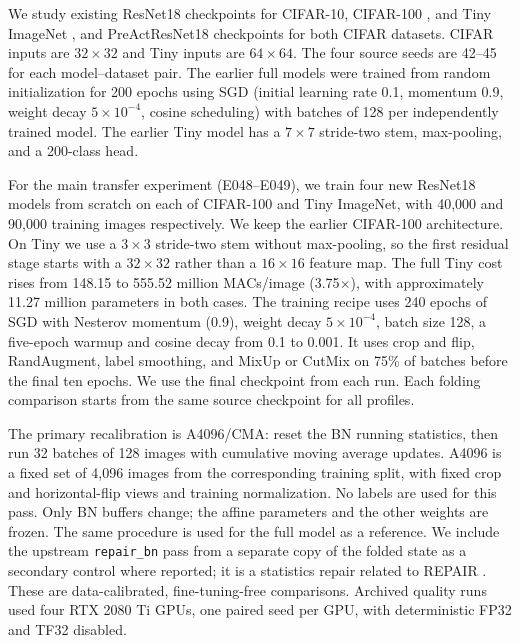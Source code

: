 \documentclass[11pt,a4paper]{article}
\begin{document}
We study existing ResNet18 checkpoints \citep{he2016resnet} for
CIFAR-10, CIFAR-100 \citep{krizhevsky2009cifar}, and Tiny ImageNet
\citep{stanfordTinyImageNet}, and PreActResNet18 checkpoints
\citep{he2016preact} for both CIFAR datasets. CIFAR inputs are
$32\times32$ and Tiny inputs are $64\times64$. The four source seeds
are 42--45 for each model--dataset pair. The earlier full models were trained
from random initialization for 200 epochs using SGD (initial learning
rate 0.1, momentum 0.9, weight decay $5\times10^{-4}$, cosine scheduling)
with batches of 128 per independently trained model. The earlier Tiny
model has a $7\times7$ stride-two stem, max-pooling, and a 200-class head.

For the main transfer experiment (E048--E049), we train four new
ResNet18 models from scratch on each of CIFAR-100 and Tiny ImageNet,
with 40,000 and 90,000 training images respectively. We keep the earlier
CIFAR-100 architecture. On Tiny we use a $3\times3$ stride-two stem
without max-pooling, so the first residual stage starts with a
$32\times32$ rather than a $16\times16$ feature map. The full Tiny cost
rises from 148.15 to 555.52 million MACs/image (3.75$\times$), with
approximately 11.27 million parameters in both cases. The training recipe
uses 240 epochs of SGD with Nesterov momentum (0.9), weight decay
$5\times10^{-4}$, batch size 128, a five-epoch warmup and cosine decay
from 0.1 to 0.001. It uses crop and flip, RandAugment, label smoothing,
and MixUp or CutMix on 75\% of batches before the final ten epochs.
We use the final checkpoint from each run. Each folding comparison
starts from the same source checkpoint for all profiles.

The primary recalibration is A4096/CMA: reset the BN
\citep{ioffe2015bn} running statistics, then run 32 batches of 128 images
with cumulative moving average updates. A4096 is a fixed set of 4,096
images from the corresponding training split, with fixed crop and
horizontal-flip views and training normalization. No labels are used
for this pass. Only BN buffers change; the affine parameters and the
other weights are frozen. The same procedure is used for the full model
as a reference. We include the upstream \texttt{repair\_bn} pass from a
separate copy of the folded state as a secondary control where reported;
it is a statistics repair related to REPAIR \citep{jordan2023repair}.
These are data-calibrated, fine-tuning-free comparisons. Archived quality
runs used four RTX 2080 Ti GPUs, one paired seed per GPU, with deterministic
FP32 and TF32 disabled.
\end{document}
